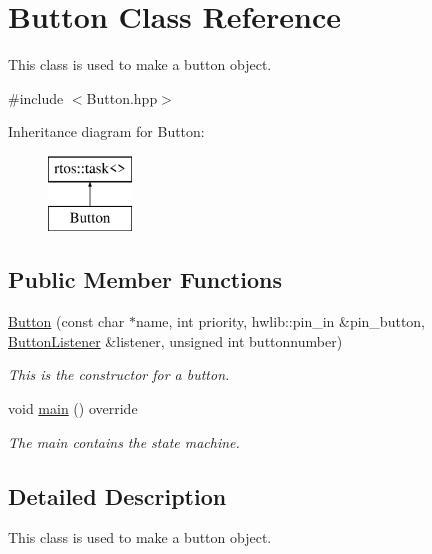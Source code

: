 \hypertarget{class_button}{}\section{Button Class Reference}
\label{class_button}


This class is used to make a button object.  




{\ttfamily \#include $<$Button.\+hpp$>$}

Inheritance diagram for Button\+:\begin{figure}[H]
\begin{center}
\leavevmode
\includegraphics[height=2.000000cm]{class_button}
\end{center}
\end{figure}
\subsection*{Public Member Functions}
\begin{DoxyCompactItemize}
\item 
\mbox{\hyperlink{class_button_a7771486e8e6649ee30c85ab5580796da}{Button}} (const char $\ast$name, int priority, hwlib\+::pin\+\_\+in \&pin\+\_\+button, \mbox{\hyperlink{class_button_listener}{Button\+Listener}} \&listener, unsigned int buttonnumber)
\begin{DoxyCompactList}\small\item\em This is the constructor for a button. \end{DoxyCompactList}\item 
void \mbox{\hyperlink{class_button_a4cc671cc425acd0ee1b8f2f437cf40db}{main}} () override
\begin{DoxyCompactList}\small\item\em The main contains the state machine. \end{DoxyCompactList}\end{DoxyCompactItemize}


\subsection{Detailed Description}
This class is used to make a button object. 

